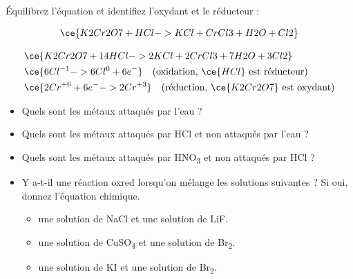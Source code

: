 \documentclass[
  11pt,
  a4paper,
  openany]{book}
\providecommand{\tightlist}{%
  \setlength{\itemsep}{0pt}\setlength{\parskip}{0pt}}
\begin{document}
\begin{Exercise}
Équilibrez l'équation et identifiez l'oxydant et le réducteur :

\[
\ce{K2Cr2O7 + HCl -> KCl + CrCl3 + H2O + Cl2}
\]

\end{Exercise}

\begin{Answer}
\[
\begin{split}
& \ce{K2Cr2O7 + 14 HCl -> 2 KCl + 2 CrCl3 + 7 H2O + 3 Cl2} \\
& \ce{ 6 Cl^{-1} -> 6 Cl^{0} + 6 e^-} \quad \text{(oxidation, $\ce{HCl}$ est réducteur)} \\
& \ce{ 2 Cr^{+6} + 6 e^- -> 2 Cr^{+3}} \quad \text{(réduction, $\ce{K2Cr2O7}$ est oxydant)}
\end{split}
\]

\end{Answer}

\begin{Exercise}

\begin{itemize}
\tightlist
\item
  Quels sont les métaux attaqués par l'eau ?
\item
  Quels sont les métaux attaqués par HCl et non attaqués par l'eau ?
\item
  Quels sont les métaux attaqués par HNO\textsubscript{3} et non attaqués par HCl ?
\item
  Y a-t-il une réaction oxred lorsqu'on mélange les solutions suivantes ? Si oui, donnez l'équation chimique.

  \begin{itemize}
  \tightlist
  \item
    une solution de NaCl et une solution de LiF.
  \item
    une solution de CuSO\textsubscript{4} et une solution de Br\textsubscript{2}.
  \item
    une solution de KI et une solution de Br\textsubscript{2}.
  \end{itemize}
\end{itemize}

\end{Exercise}
\end{document}

